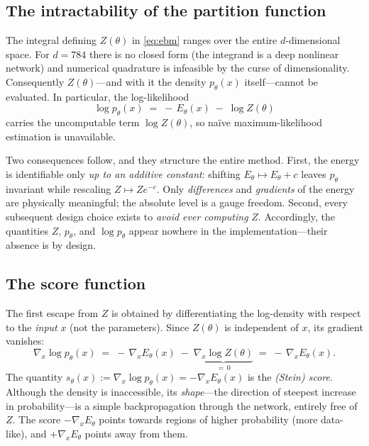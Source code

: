 \subsection{The intractability of the partition function}

The integral defining $Z(\theta)$ in \eqref{eq:ebm} ranges over the entire
$d$-dimensional space. For $d = 784$ there is no closed form (the integrand is a deep
nonlinear network) and numerical quadrature is infeasible by the curse of dimensionality.
Consequently $Z(\theta)$---and with it the density $p_\theta(x)$ itself---cannot be
evaluated. In particular, the log-likelihood
\begin{equation}
  \log p_\theta(x) \;=\; -\,E_\theta(x) \;-\; \log Z(\theta)
  \label{eq:loglik}
\end{equation}
carries the uncomputable term $\log Z(\theta)$, so na\"ive maximum-likelihood estimation
is unavailable.

Two consequences follow, and they structure the entire method. First, the energy is
identifiable only \emph{up to an additive constant}: shifting $E_\theta \mapsto E_\theta +
c$ leaves $p_\theta$ invariant while rescaling $Z \mapsto Z e^{-c}$. Only \emph{differences}
and \emph{gradients} of the energy are physically meaningful; the absolute level is a
gauge freedom. Second, every subsequent design choice exists to \emph{avoid ever
computing} $Z$. Accordingly, the quantities $Z$, $p_\theta$, and $\log p_\theta$ appear
nowhere in the implementation---their absence is by design.

\subsection{The score function}

The first escape from $Z$ is obtained by differentiating the log-density with respect to
the \emph{input} $x$ (not the parameters). Since $Z(\theta)$ is independent of $x$, its
gradient vanishes:
\begin{equation}
  \nabla_x \log p_\theta(x)
  \;=\; -\,\nabla_x E_\theta(x) \;-\; \underbrace{\nabla_x \log Z(\theta)}_{=\,0}
  \;=\; -\,\nabla_x E_\theta(x).
  \label{eq:score}
\end{equation}
The quantity $s_\theta(x) := \nabla_x \log p_\theta(x) = -\nabla_x E_\theta(x)$ is the
\emph{(Stein) score}. Although the density is inaccessible, its \emph{shape}---the
direction of steepest increase in probability---is a simple backpropagation through the
network, entirely free of $Z$. The score $-\nabla_x E_\theta$ points towards regions of
higher probability (more data-like), and $+\nabla_x E_\theta$ points away from them.

